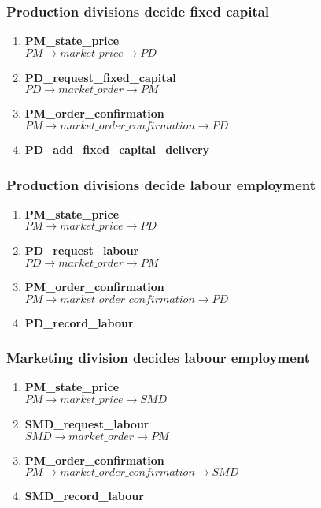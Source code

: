 \documentclass[11pt]{article}
\begin{document}
\subsubsection{Production divisions decide fixed capital}
\begin{enumerate}
	\item \textbf{PM\_state\_price} \\
	$ PM \rightarrow market\_price \rightarrow PD $
	\item \textbf{PD\_request\_fixed\_capital} \\
	$ PD \rightarrow market\_order \rightarrow PM $
	\item \textbf{PM\_order\_confirmation} \\
	$ PM \rightarrow market\_order\_confirmation \rightarrow PD $
	\item \textbf{PD\_add\_fixed\_capital\_delivery}
\end{enumerate}

\subsubsection{Production divisions decide labour employment}
\begin{enumerate}
	\item \textbf{PM\_state\_price} \\
	$ PM \rightarrow market\_price \rightarrow PD $
	\item \textbf{PD\_request\_labour} \\
	$ PD \rightarrow market\_order \rightarrow PM $
	\item \textbf{PM\_order\_confirmation} \\
	$ PM \rightarrow market\_order\_confirmation \rightarrow PD $
	\item \textbf{PD\_record\_labour}
\end{enumerate}

\subsubsection{Marketing division decides labour employment}
\begin{enumerate}
	\item \textbf{PM\_state\_price} \\
	$ PM \rightarrow market\_price \rightarrow SMD $
	\item \textbf{SMD\_request\_labour} \\
	$ SMD \rightarrow market\_order \rightarrow PM $
	\item \textbf{PM\_order\_confirmation} \\
	$ PM \rightarrow market\_order\_confirmation \rightarrow SMD $
	\item \textbf{SMD\_record\_labour}
\end{enumerate}
\end{document}
